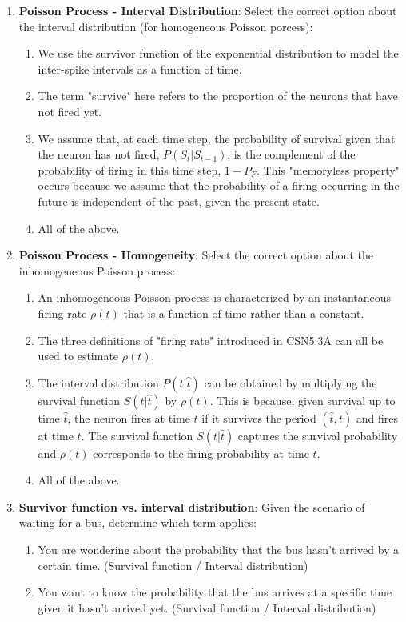 \documentclass[11pt,letterpaper]{article}
\begin{document}
\begin{enumerate}
    \item \textbf{Poisson Process - Interval Distribution}: Select the correct option about the interval distribution (for homogeneous Poisson porcess):
    \begin{enumerate}
        \item We use the survivor function of the exponential distribution to model the inter-spike intervals as a function of time.
        \item The term "survive" here refers to the proportion of the neurons that have not fired yet.
        \item We assume that, at each time step, the probability of survival given that the neuron has not fired, $P(S_t|S_{t-1})$, is the complement of the probability of firing in this time step, $1 - P_F$.  This "memoryless property" occurs because we assume that the probability of a firing occurring in the future is independent of the past, given the present state.
        \item All of the above.
    \end{enumerate}

    \item \textbf{Poisson Process - Homogeneity}: Select the correct option about the inhomogeneous Poisson process:
    \begin{enumerate}
        \item An inhomogeneous Poisson process is characterized by an instantaneous firing rate $\rho(t)$ that is a function of time rather than a constant.
        \item The three definitions of "firing rate" introduced in CSN5.3A can all be used to estimate $\rho(t)$.
        \item The interval distribution $P(t|\hat{t})$ can be obtained by multiplying the survival function $S(t|\hat{t})$ by $\rho(t)$. This is because, given survival up to time $\hat{t}$, the neuron fires at time $t$ if it survives the period $(\hat{t}, t)$ and fires at time $t$. The survival function $S(t|\hat{t})$ captures the survival probability and $\rho(t)$ corresponds to the firing probability at time $t$.
        \item All of the above.
    \end{enumerate}

    \item \textbf{Survivor function vs. interval distribution}: Given the scenario of waiting for a bus, determine which term applies:
    \begin{enumerate}
        \item You are wondering about the probability that the bus hasn't arrived by a certain time. (Survival function / Interval distribution)
        \item You want to know the probability that the bus arrives at a specific time given it hasn't arrived yet. (Survival function / Interval distribution)
    \end{enumerate}

\end{enumerate}
\pagebreak
\end{document}
